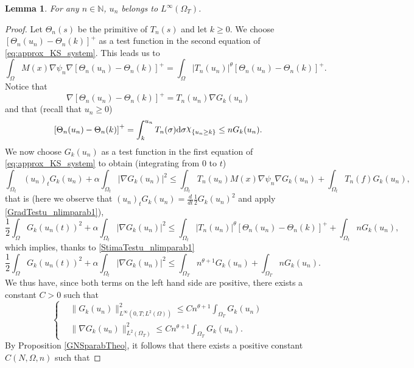 \documentclass{amsart}
\numberwithin{equation}{section}
\newtheorem{lemma}[example]{Lemma}
\def\elle#1{L^{#1}}
\def\elleom#1{L^{#1}(\Omega)}
\def\elleomT#1{L^{#1}(\Omega_T)}
\def\io{\int_\Omega}
\def\iot{\int_{\Omega_t}}
\def\ioT{\int_{\Omega_T}}
\def\norma#1#2{ \|#1 \|_{#2}}
\def\N{\mathbb{N}}
\newcommand{\abs}[1]{\left|#1\right|}
\DeclareRobustCommand{\rchi}{{\mathpalette\irchi\relax}}
\newcommand{\irchi}[2]{\raisebox{\depth}{$#1\chi$}} %
\begin{document}
\begin{lemma}\label{lemma:stima_un_infty:dep_n}
    For any $n\in\N$, $u_n$ belongs to $\elle\infty(\Omega_T)$.
\end{lemma}
\begin{proof}
    Let $\Theta_n(s)$ be the primitive of $T_n(s)$ and let $k\geq0$. We choose $\left[\Theta_n(u_n)-\Theta_n(k)\right]^+$ as a test function in the second equation of \eqref{eq:approx_KS_system}. This leads us to
    $$
    \io M(x)\nabla\psi_n\nabla\left[\Theta_n(u_n)-\Theta_n(k)\right]^+=\io \abs{T_n(u_n)}^\theta\left[\Theta_n(u_n)-\Theta_n(k)\right]^+.
    $$
    Notice that 
    \begin{equation}\label{GradTestu_nlimparab1}
        \nabla\left[\Theta_n(u_n)-\Theta_n(k)\right]^+=T_n(u_n)\nabla G_k(u_n)
    \end{equation}
    and that (recall that $u_n\geq0$)
    \begin{equation}\label{StimaTestu_nlimparab1}
        \left[\Theta_n(u_n)-\Theta_n(k)\right]^+=\int_k^{u_n}T_n(\sigma)\mathrm{d}\sigma\rchi_{\{u_n\geq k\}}\leq nG_k(u_n).
    \end{equation}    
    We now choose $G_k(u_n)$ as a test function in the first equation of \eqref{eq:approx_KS_system} to obtain (integrating from $0$ to $t$)
    $$
    \iot (u_n)_t G_k(u_n)+\alpha\iot\abs{\nabla G_k(u_n)}^2
    \leq 
    \iot T_n(u_n)M(x)\nabla\psi_n\nabla G_k(u_n)+\iot T_n(f) G_k(u_n),
    $$
    that is (here we observe that $(u_n)_t G_k(u_n)=\frac{d}{dt}\frac12 G_k(u_n)^2$ and apply \eqref{GradTestu_nlimparab1}),
    $$
    \frac12\io  G_k(u_n(t))^2+\alpha\iot\abs{\nabla G_k(u_n)}^2
    \leq 
    \iot \abs{T_n(u_n)}^\theta\left[\Theta_n(u_n)-\Theta_n(k)\right]^++\iot n G_k(u_n),
    $$
    which implies, thanks to \eqref{StimaTestu_nlimparab1}
    $$
    \frac12\io  G_k(u_n(t))^2+\alpha\iot\abs{\nabla G_k(u_n)}^2
    \leq 
    \ioT n^{\theta+1}G_k(u_n)+\ioT n G_k(u_n).
    $$
    We thus have, since both terms on the left hand side are positive, there exists a constant $C>0$ such that
    \begin{equation}
        \left\{\begin{aligned}
        & \norma{G_k(u_n)}{\elle\infty(0,T;\elleom2)}^2\leq C n^{\theta+1}\int_{\Omega_T}G_k(u_n)\\
        & \norma{\nabla G_k(u_n)}{\elleomT2}^2\leq C n^{\theta+1}\int_{\Omega_T}G_k(u_n).
        \end{aligned}\right.
    \end{equation}
    By Proposition \ref{GNSparabTheo}, it follows that there exists a positive constant $C(N,\Omega,n)$ such that

\end{proof}
\end{document}
